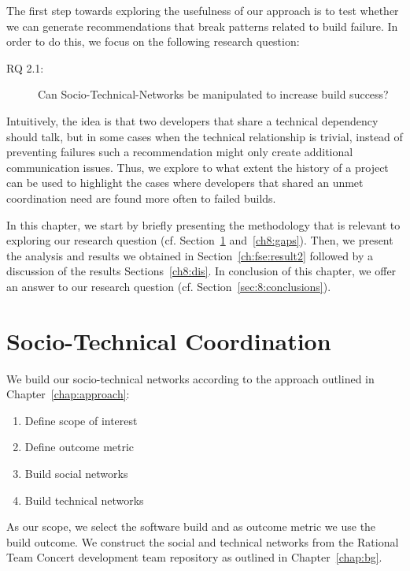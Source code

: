 \label{chap:stc-net}
The first step towards exploring the usefulness of our approach is to test whether we can generate recommendations that break patterns related to build failure.
In order to do this, we focus on the following research question:

\begin{description}
  \item[RQ 2.1:] Can Socio-Technical-Networks be manipulated to increase build success? 
\end{description}

Intuitively, the idea is that two developers that share a technical dependency should talk, but in some cases when the technical relationship is trivial, instead of preventing failures such a recommendation might only create additional communication issues.
Thus, we explore to what extent the history of a project can be used to highlight the cases where developers that shared an unmet coordination need are found more often to failed builds.

In this chapter, we start by briefly presenting the methodology that is relevant to exploring our research question (cf. Section~\ref{sec:data} and~\ref{ch8:gaps}).
Then, we present the analysis and results we obtained in Section~\ref{ch:fse:result2} followed by a discussion of the results Sections~\ref{ch8:dis}.
In conclusion of this chapter, we offer an answer to our research question (cf. Section~\ref{sec:8:conclusions}).


\section{Socio-Technical Coordination}
\label{sec:data}
We build our socio-technical networks according to the approach outlined in Chapter~\ref{chap:approach}:

\begin{enumerate}
\item Define scope of interest
\item Define outcome metric
\item Build social networks
\item Build technical networks
\end{enumerate}

As our scope, we select the software build and as outcome metric we use the build outcome.
We construct the social and technical networks from the Rational Team Concert development team repository as outlined in Chapter~\ref{chap:bg}.


